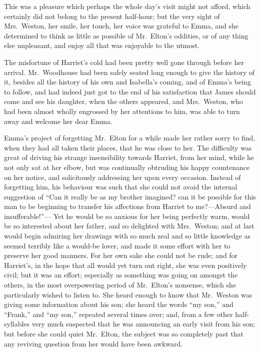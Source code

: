 This was a pleasure which perhaps the whole day's visit might
not afford, which certainly did not belong to the present half-hour;
but the very sight of Mrs.\ Weston, her smile, her touch, her voice
was grateful to Emma, and she determined to think as little as
possible of Mr.\ Elton's oddities, or of any thing else unpleasant,
and enjoy all that was enjoyable to the utmost.

The misfortune of Harriet's cold had been pretty well gone through
before her arrival.  Mr.\ Woodhouse had been safely seated long
enough to give the history of it, besides all the history of his own
and Isabella's coming, and of Emma's being to follow, and had indeed
just got to the end of his satisfaction that James should come
and see his daughter, when the others appeared, and Mrs.\ Weston,
who had been almost wholly engrossed by her attentions to him,
was able to turn away and welcome her dear Emma.

Emma's project of forgetting Mr.\ Elton for a while made her rather
sorry to find, when they had all taken their places, that he was
close to her.  The difficulty was great of driving his strange
insensibility towards Harriet, from her mind, while he not only sat
at her elbow, but was continually obtruding his happy countenance
on her notice, and solicitously addressing her upon every occasion.
Instead of forgetting him, his behaviour was such that she could
not avoid the internal suggestion of ``Can it really be as my brother
imagined? can it be possible for this man to be beginning to transfer
his affections from Harriet to me?---Absurd and insufferable!''---%
Yet he would be so anxious for her being perfectly warm, would be
so interested about her father, and so delighted with Mrs.\ Weston;
and at last would begin admiring her drawings with so much zeal
and so little knowledge as seemed terribly like a would-be lover,
and made it some effort with her to preserve her good manners.
For her own sake she could not be rude; and for Harriet's, in the hope
that all would yet turn out right, she was even positively civil;
but it was an effort; especially as something was going on amongst
the others, in the most overpowering period of Mr.\ Elton's nonsense,
which she particularly wished to listen to.  She heard enough
to know that Mr.\ Weston was giving some information about his son;
she heard the words ``my son,'' and ``Frank,'' and ``my son,''
repeated several times over; and, from a few other half-syllables
very much suspected that he was announcing an early visit from
his son; but before she could quiet Mr.\ Elton, the subject was
so completely past that any reviving question from her would have
been awkward.

